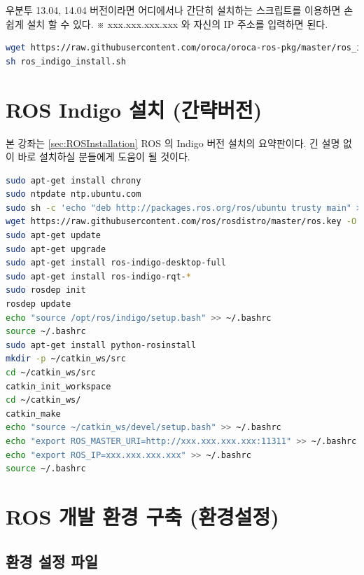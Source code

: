우분투 13.04, 14.04 버전이라면 어디에서나 간단히 설치하는 스크립트를 이용하면 손쉽게 설치 할 수 있다. ※ xxx.xxx.xxx.xxx 와 자신의 IP 주소를 입력하면 된다.

\begin{lstlisting}[language=bash]
wget https://raw.githubusercontent.com/oroca/oroca-ros-pkg/master/ros_indigo_install.sh
sh ros_indigo_install.sh
\end{lstlisting}

\section{ROS Indigo 설치 (간략버전)}

본 강좌는 \ref{sec:ROSInstallation} ROS 의 Indigo 버전 설치의 요약판이다. 긴 설명 없이 바로 설치하실 분들에게 도움이 될 것이다.

\begin{lstlisting}[language=bash]
sudo apt-get install chrony
sudo ntpdate ntp.ubuntu.com
sudo sh -c 'echo "deb http://packages.ros.org/ros/ubuntu trusty main" > /etc/apt/sources.list.d/ros-latest.list'
wget https://raw.githubusercontent.com/ros/rosdistro/master/ros.key -O - | sudo apt-key add -
sudo apt-get update
sudo apt-get upgrade
sudo apt-get install ros-indigo-desktop-full
sudo apt-get install ros-indigo-rqt-*
sudo rosdep init
rosdep update
echo "source /opt/ros/indigo/setup.bash" >> ~/.bashrc
source ~/.bashrc
sudo apt-get install python-rosinstall
mkdir -p ~/catkin_ws/src
cd ~/catkin_ws/src
catkin_init_workspace
cd ~/catkin_ws/
catkin_make
echo "source ~/catkin_ws/devel/setup.bash" >> ~/.bashrc
echo "export ROS_MASTER_URI=http://xxx.xxx.xxx.xxx:11311" >> ~/.bashrc
echo "export ROS_IP=xxx.xxx.xxx.xxx" >> ~/.bashrc
source ~/.bashrc
\end{lstlisting}

\section{ROS 개발 환경 구축 (환경설정)}

\subsection{환경 설정 파일}

